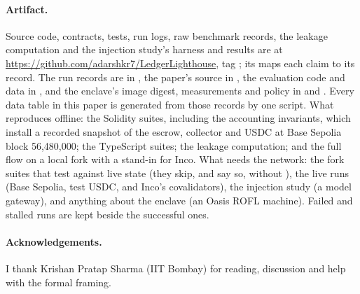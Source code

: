 \paragraph{Artifact.} Source code, contracts, tests, run logs, raw benchmark records, the leakage computation and the injection study's harness and results
are at \url{https://github.com/adarshkr7/LedgerLighthouse}, tag ; its  maps each claim to its record. The run records are
in , the paper's source in , the evaluation code and data in , and the enclave's image digest, measurements and
policy in  and . Every data table in this paper is generated from those records by one script.
What reproduces offline: the Solidity suites, including the accounting invariants, which install a recorded snapshot of the escrow, collector and USDC at
Base Sepolia block 56{,}480{,}000; the TypeScript suites; the leakage computation; and the full flow on a local fork with a stand-in for Inco. What needs the
network: the fork suites that test against live state (they skip, and say so, without ), the live runs (Base Sepolia, test USDC, and
Inco's covalidators), the injection study (a model gateway), and anything about the enclave (an Oasis ROFL machine). Failed and stalled runs are kept beside
the successful ones.

\paragraph{Acknowledgements.} I thank Krishan Pratap Sharma (IIT Bombay) for reading, discussion and help with the formal framing.
